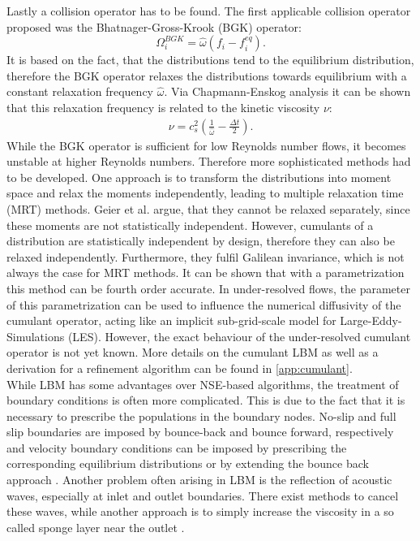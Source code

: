 Lastly a collision operator has to be found. The first applicable collision operator proposed was the Bhatnager-Gross-Krook (BGK) operator:
\begin{equation}
	\Omega^{BGK}_i = \hat{\omega}\left(f_i - f_i^{eq} \right). \label{eq:BGK}
\end{equation}
It is based on the fact, that the distributions tend to the equilibrium distribution, therefore the BGK operator relaxes the distributions towards equilibrium with a constant relaxation frequency $\hat{\omega}$. Via Chapmann-Enskog analysis it can be shown that this relaxation frequency is related to the kinetic viscosity $\nu$: \cite[p. 98-100, 112]{kruger_lattice_2017}
\begin{align}
	\nu = c_s^2\left(\frac{1}{\hat{\omega}} - \frac{\Delta t }{2} \right). \label{eq:nu}
\end{align}
While the BGK operator is sufficient for low Reynolds number flows, it becomes unstable at higher Reynolds numbers. Therefore more sophisticated methods had to be developed. One approach is to transform the distributions into moment space and relax the moments independently, leading to multiple relaxation time (MRT) methods. Geier et al. argue, that they cannot be relaxed separately, since these moments are not statistically independent. However, cumulants of a distribution are statistically independent by design, therefore they can also be relaxed independently. Furthermore, they fulfil Galilean invariance, which is not always the case for MRT methods. It can be shown that with a parametrization this method can be fourth order accurate\cite{geier_fourth_2018}. In under-resolved flows, the parameter of this parametrization can be used to influence the numerical diffusivity of the cumulant operator, acting like an implicit sub-grid-scale model for Large-Eddy-Simulations (LES)\cite{asmuth_actuator_2020}. However, the exact behaviour of the under-resolved cumulant operator is not yet known. More details on the cumulant LBM as well as a derivation for a refinement algorithm can be found in \autoref{app:cumulant}. \\
While LBM has some advantages over NSE-based algorithms, the treatment of boundary conditions is often more complicated. This is due to the fact that it is necessary to prescribe the populations in the boundary nodes. No-slip and full slip boundaries are imposed by bounce-back and bounce forward, respectively and velocity boundary conditions can be imposed by prescribing the corresponding equilibrium distributions or by extending the bounce back approach \cite[p. 175 - 189, 199 - 207]{kruger_lattice_2017}. Another problem often arising in LBM is the reflection of acoustic waves, especially at inlet and outlet boundaries. There exist methods to cancel these waves, while another approach is to simply increase the viscosity in a so called sponge layer near the outlet \cite[p. 522 - 526]{kruger_lattice_2017}.
